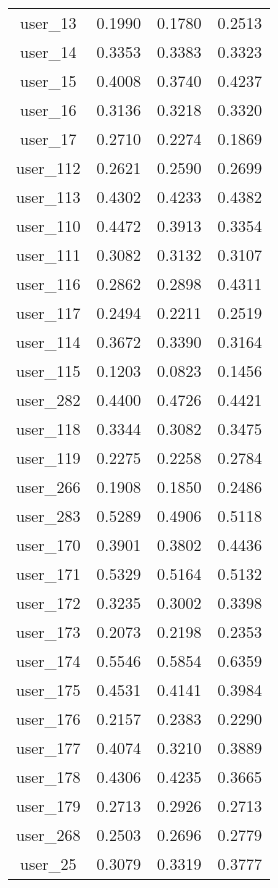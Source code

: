 \begin{table}[ht]
\begin{tabular}{|c|c|c|c|}
user_13  &  0.1990   &  0.1780   &  0.2513 \\ 
user_14  &  0.3353   &  0.3383   &  0.3323 \\ 
user_15  &  0.4008   &  0.3740   &  0.4237 \\ 
user_16  &  0.3136   &  0.3218   &  0.3320 \\ 
user_17  &  0.2710   &  0.2274   &  0.1869 \\ 
user_112  &  0.2621   &  0.2590   &  0.2699 \\ 
user_113  &  0.4302   &  0.4233   &  0.4382 \\ 
user_110  &  0.4472   &  0.3913   &  0.3354 \\ 
user_111  &  0.3082   &  0.3132   &  0.3107 \\ 
user_116  &  0.2862   &  0.2898   &  0.4311 \\ 
user_117  &  0.2494   &  0.2211   &  0.2519 \\ 
user_114  &  0.3672   &  0.3390   &  0.3164 \\ 
user_115  &  0.1203   &  0.0823   &  0.1456 \\ 
user_282  &  0.4400   &  0.4726   &  0.4421 \\ 
user_118  &  0.3344   &  0.3082   &  0.3475 \\ 
user_119  &  0.2275   &  0.2258   &  0.2784 \\ 
user_266  &  0.1908   &  0.1850   &  0.2486 \\ 
user_283  &  0.5289   &  0.4906   &  0.5118 \\ 
user_170  &  0.3901   &  0.3802   &  0.4436 \\ 
user_171  &  0.5329   &  0.5164   &  0.5132 \\ 
user_172  &  0.3235   &  0.3002   &  0.3398 \\ 
user_173  &  0.2073   &  0.2198   &  0.2353 \\ 
user_174  &  0.5546   &  0.5854   &  0.6359 \\ 
user_175  &  0.4531   &  0.4141   &  0.3984 \\ 
user_176  &  0.2157   &  0.2383   &  0.2290 \\ 
user_177  &  0.4074   &  0.3210   &  0.3889 \\ 
user_178  &  0.4306   &  0.4235   &  0.3665 \\ 
user_179  &  0.2713   &  0.2926   &  0.2713 \\ 
user_268  &  0.2503   &  0.2696   &  0.2779 \\ 
user_25  &  0.3079   &  0.3319   &  0.3777 \\ 

\end{tabular}
\end{table}

